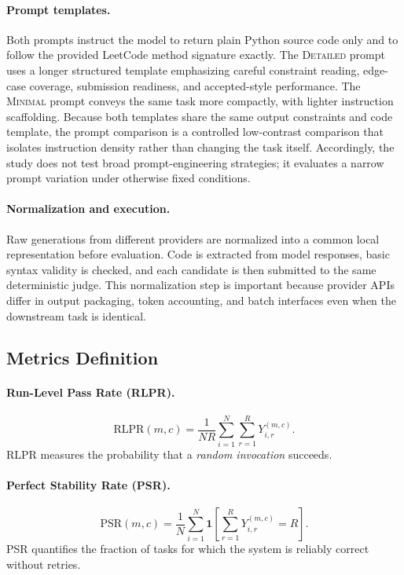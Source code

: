 \documentclass[11pt,a4paper]{article}
\begin{document}
\paragraph{Prompt templates.} Both prompts instruct the model to return plain Python source code only and to follow the provided LeetCode method signature exactly. The \textsc{Detailed} prompt uses a longer structured template emphasizing careful constraint reading, edge-case coverage, submission readiness, and accepted-style performance. The \textsc{Minimal} prompt conveys the same task more compactly, with lighter instruction scaffolding. Because both templates share the same output constraints and code template, the prompt comparison is a controlled low-contrast comparison that isolates instruction density rather than changing the task itself. Accordingly, the study does not test broad prompt-engineering strategies; it evaluates a narrow prompt variation under otherwise fixed conditions.

\paragraph{Normalization and execution.} Raw generations from different providers are normalized into a common local representation before evaluation. Code is extracted from model responses, basic syntax validity is checked, and each candidate is then submitted to the same deterministic judge. This normalization step is important because provider APIs differ in output packaging, token accounting, and batch interfaces even when the downstream task is identical.

\subsection{Metrics Definition}
\label{sec:metrics}

\paragraph{Run-Level Pass Rate (RLPR).}
$$
\mathrm{RLPR}(m,c)=\frac{1}{NR}\sum_{i=1}^{N}\sum_{r=1}^{R} Y_{i,r}^{(m,c)}.
$$
RLPR measures the probability that a \emph{random invocation} succeeds.

\paragraph{Perfect Stability Rate (PSR).}
$$
\mathrm{PSR}(m,c)=\frac{1}{N}\sum_{i=1}^{N} \mathbf{1}\!\left[\sum_{r=1}^{R} Y_{i,r}^{(m,c)}=R\right].
$$
PSR quantifies the fraction of tasks for which the system is reliably correct without retries.
\end{document}
